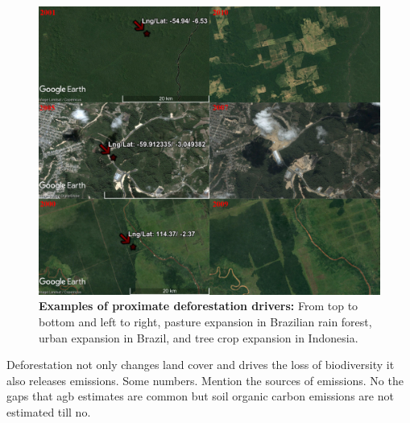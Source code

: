 	\begin{figure}[ht]
		\centering
		\includegraphics[scale=0.6]{img/deforestation_examples}
		\caption[Examples of proximate deforestation drivers]{\textbf{Examples of proximate deforestation drivers:} From top to bottom and left to right, pasture expansion in Brazilian rain forest, urban expansion in Brazil, and tree crop expansion in Indonesia.}
		\label{fig:deforestationexamples}
	\end{figure}

	 Deforestation not only changes land cover and drives the loss of biodiversity it also releases emissions. Some numbers. Mention the sources of emissions. No the gaps that agb estimates are common but soil organic carbon emissions are not estimated till no.

